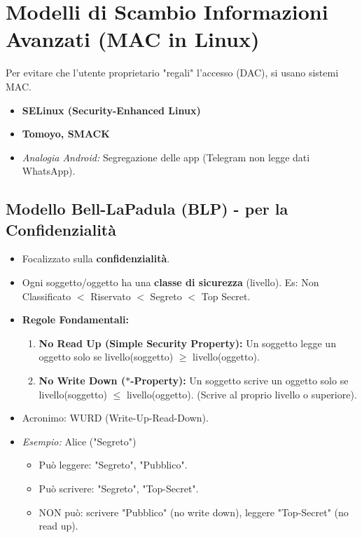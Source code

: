 \documentclass{article}
\begin{document}
\section{Modelli di Scambio Informazioni Avanzati (MAC in Linux)}
Per evitare che l'utente proprietario "regali" l'accesso (DAC), si usano sistemi MAC.
\begin{itemize}
    \item \textbf{SELinux (Security-Enhanced Linux)}
    \item \textbf{Tomoyo, SMACK}
    \item \textit{Analogia Android:} Segregazione delle app (Telegram non legge dati WhatsApp).
\end{itemize}

\subsection{Modello Bell-LaPadula (BLP) - per la Confidenzialità}
\begin{itemize}
    \item Focalizzato sulla \textbf{confidenzialità}.
    \item Ogni soggetto/oggetto ha una \textbf{classe di sicurezza} (livello). Es: Non Classificato $<$ Riservato $<$ Segreto $<$ Top Secret.
    \item \textbf{Regole Fondamentali:}
    \begin{enumerate}
        \item \textbf{No Read Up (Simple Security Property):} Un soggetto legge un oggetto solo se livello(soggetto) $\geq$ livello(oggetto).
        \item \textbf{No Write Down ($\ast$-Property):} Un soggetto scrive un oggetto solo se livello(soggetto) $\leq$ livello(oggetto). (Scrive al proprio livello o superiore).
    \end{enumerate}
    \item Acronimo: WURD (Write-Up-Read-Down).
    \item \textit{Esempio:} Alice ("Segreto")
    \begin{itemize}
        \item Può leggere: "Segreto", "Pubblico".
        \item Può scrivere: "Segreto", "Top-Secret".
        \item NON può: scrivere "Pubblico" (no write down), leggere "Top-Secret" (no read up).
    \end{itemize}
\end{itemize}
\end{document}
